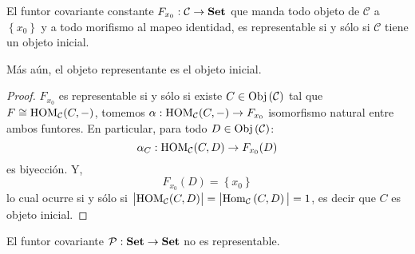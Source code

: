 \documentclass[12pt]{report}
\theoremstyle{largebreak}
\newcommand\abs[1]{\ensuremath{\big|#1\big|}}
\newcommand\cf[3]{\ensuremath{#1:#2\rightarrow#3}}
\newcommand{\Obj}[1]{\ensuremath{\textup{Obj}\left(#1\right)}}
\newcommand{\Hom}[3]{\ensuremath{\textup{Hom}_{#1}\left(#2,#3\right)}}
\newcommand{\Cat}[1]{\ensuremath{\textup{\textbf{#1}}}}
\begin{document}
    \begin{exa}
        El funtor covariante constante $\cf{F_{x_0}}{\mathcal{C}}{\Cat{Set}}$ que manda todo objeto de $\mathcal{C}$ a $\left\{x_0\right\}$ y a todo morifismo al mapeo identidad, es representable si y sólo si $\mathcal{C}$ tiene un objeto inicial.

        Más aún, el objeto representante es el objeto inicial.
    \end{exa}

    \begin{proof}
        $F_{x_0}$ es representable si y sólo si existe $C\in\Obj{\mathcal{C}}$ tal que $F\cong \textup{HOM}_{\mathcal{C}}(C,-)$, tomemos $\cf{\alpha}{\HOM{\mathcal{C}}(C,-)}{F_{ x_0}}$ isomorfismo natural entre ambos funtores. En particular, para todo $D\in\Obj{\mathcal{C}}$:
        \begin{equation*}
            \cf{\alpha_C}{\HOM{\mathcal{C}}(C,D)}{F_{x_0}(D)}
        \end{equation*}
        es biyección. Y,
        \begin{equation*}
            F_{x_0}(D)=\left\{x_0\right\}
        \end{equation*}
        lo cual ocurre si y sólo si $\abs{\HOM{\mathcal{C}}(C,D)}=\abs{\Hom{\mathcal{C}}{C}{D}}=1$, es decir que $C$ es objeto inicial.
    \end{proof}

    \begin{exa}
        El funtor covariante $\cf{\mathcal{P}}{\Cat{Set}}{\Cat{Set}}$ no es representable.
    \end{exa}
\end{document}
